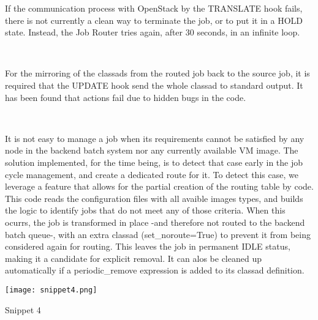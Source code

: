\documentclass[a4paper]{jpconf}
\begin{document}
If the communication process with OpenStack by the TRANSLATE hook fails, 
there is not currently a clean way to terminate the job, or to put it in a HOLD
state. Instead, the Job Router tries again, after 30 seconds, in an infinite loop.

~

For the mirroring of the classads from the routed job back to the source job, 
it is required that the UPDATE hook send the whole classad to standard output. 
It has been found that actions fail due to hidden bugs in the code. 

~

It is not easy to manage a job when its requirements cannot be satisfied by any
node in the backend batch system nor any currently available VM image. 
The solution implemented, for the time being, is to detect that case early in
the job cycle management, and create a dedicated route for it. 
To detect this case, we leverage a feature that allows for the partial creation of the routing table by code.
This code reads the configuration files with all avaible images types, and builds the logic to identify jobs that do not meet any of those criteria. 
When this ocurrs, the job is transformed in place -and therefore not routed to
the backend batch queue-, with an extra classad (set\_noroute=True) to prevent it from being considered again for routing.
This leaves the job in permanent IDLE status, making it a candidate for
explicit removal. It can alos be cleaned up automatically if a
periodic\_remove expression is added to its classad definition.

\begin{snippet}[h]
    \centering
    \renewcommand\figurename{Snippet}
    \texttt{[image: snippet4.png]}
    \caption{Snippet 4}
    \label{fig:snippet4}
\end{snippet}

\end{document}

